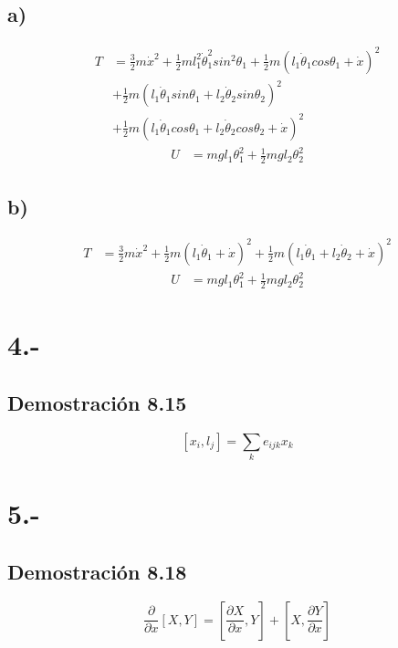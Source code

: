 \documentclass{article}
\begin{document}
\begin{tcolorbox}[breakable]
    \subsection*{a)}
    \begin{align*}
        T 
        &= \frac{3}{2}m\dot{x}^2 + \frac{1}{2}ml_1^2\dot{\theta}_1^2sin^2\theta_1 + \frac{1}{2}m(l_1 \dot{\theta}_1 cos\theta_1 + \dot{x})^2 \\
        &+ \frac{1}{2}m(l_1\dot{\theta}_1 sin\theta_1 + l_2\dot{\theta}_2 sin\theta_2)^2 \\
        &+ \frac{1}{2}m(l_1\dot{\theta}_1cos\theta_1 + l_2\dot{\theta}_2 cos\theta_2 + \dot{x})^2
    \end{align*}
    \begin{align*}
        U
        &= mgl_1\theta_1^2 + \frac{1}{2}mgl_2\theta_2^2
    \end{align*}
    \subsection*{b)}
    \begin{align*}
        T
        &= \frac{3}{2}m\dot{x}^2 + \frac{1}{2}m(l_1\dot{\theta}_1 + \dot{x})^2 + \frac{1}{2}m(l_1\dot{\theta}_1+l_2\dot{\theta}_2 + \dot{x})^2
    \end{align*}
    \begin{align*}
        U
        &= mgl_1\theta_1^2 + \frac{1}{2}mgl_2\theta_2^2
    \end{align*}

\end{tcolorbox}

\section*{4.-}
\subsection*{Demostración 8.15}
\[ [x_i,l_j] = \sum_{k}e_{ijk}x_k \]
\begin{tcolorbox}[breakable]
    
\end{tcolorbox}

\section*{5.-}
\subsection*{Demostración 8.18}
\[ \frac{\partial }{\partial x}[X,Y] = [\frac{\partial X}{\partial x},Y] + [X,\frac{\partial Y}{\partial x}] \]
\begin{tcolorbox}[breakable]
    
\end{tcolorbox}
\end{document}
